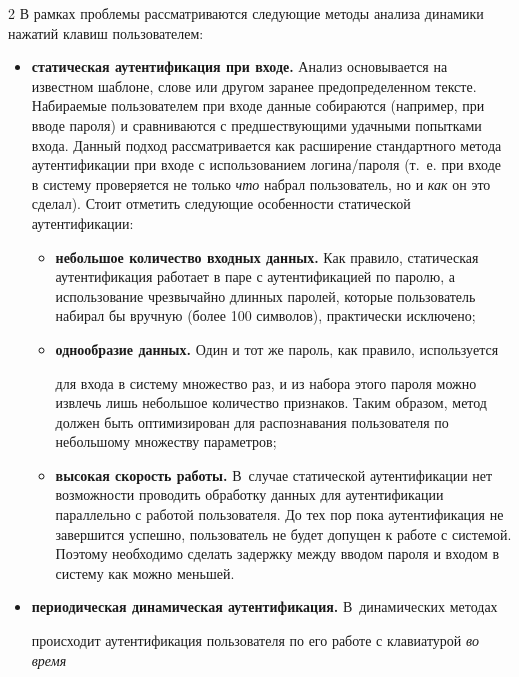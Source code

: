\begin{multicols}{2}
В рамках проблемы рассматриваются сле\-ду\-ющие методы анализа динамики нажатий клавиш пользователем:

\begin{itemize}

    \item \textbf{статическая аутентификация при входе.} Анализ основывается на известном шаблоне, слове или другом заранее предопределенном тексте. Набираемые пользователем при входе данные собираются (например, при вводе пароля) и сравниваются с предшествующими удачными попытками входа. Данный подход рассматривается как расширение стандартного метода аутентификации при входе с использованием логина/пароля (т.~е. при входе в систему проверяется не только \textit{что} набрал пользователь, но и \textit{как} он это сделал). Стоит отметить следующие особенности статической аутентификации:

    \begin{itemize}\label{goal}

        \item {\bf небольшое количество входных данных.} Как правило, статическая аутентификация работает в паре с аутентификацией по паролю, а использование чрезвычайно длинных паролей, которые пользователь набирал бы вручную (более 100 символов), практически исключено;

        \item {\bf однообразие данных.} Один и тот же пароль, как правило, используется 

        для входа в сис\-те\-му множество раз, и из набора этого пароля можно извлечь лишь небольшое количество признаков. Таким образом, метод должен быть оптимизирован для распознавания пользователя по небольшому множеству параметров;

         \item {\bf высокая скорость работы.} В~случае статической аутентификации нет возможности проводить обработку данных для аутентификации параллельно с работой пользователя. До тех пор пока аутентификация не завершится успешно, пользователь не будет допущен к работе с системой. Поэтому необходимо сделать задержку между вводом пароля и входом в систему как можно меньшей.

    \end{itemize}



    \item \textbf{периодическая динамическая аутентификация.} В~динамических методах 

    происходит аутентификация пользователя по его работе с клавиатурой \textit{во время} 


\end{itemize}
\end{multicols}
